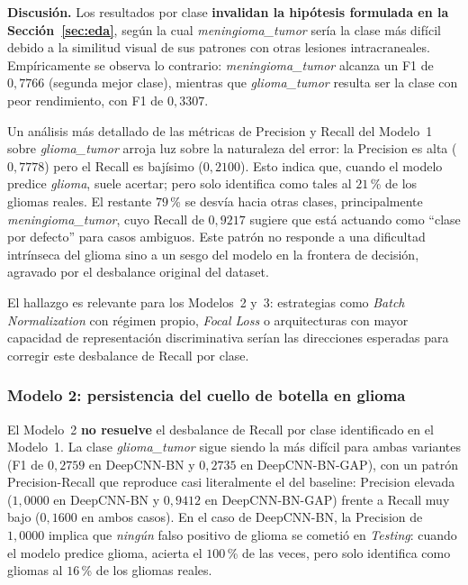 \noindent\textbf{Discusión.} Los resultados por clase
\textbf{invalidan la hipótesis formulada en la
Sección~\ref{sec:eda}}, según la cual
\textit{meningioma\_tumor} sería la clase más difícil debido a
la similitud visual de sus patrones con otras lesiones
intracraneales. Empíricamente se observa lo contrario:
\textit{meningioma\_tumor} alcanza un F1 de $0{,}7766$ (segunda
mejor clase), mientras que \textit{glioma\_tumor} resulta ser
la clase con peor rendimiento, con F1 de $0{,}3307$.

Un análisis más detallado de las métricas de Precision y Recall
del Modelo~1 sobre \textit{glioma\_tumor} arroja luz sobre la
naturaleza del error: la Precision es alta ($0{,}7778$) pero el
Recall es bajísimo ($0{,}2100$). Esto indica que, cuando el
modelo predice \textit{glioma}, suele acertar; pero solo
identifica como tales al $21$\,\% de los gliomas reales. El
restante $79$\,\% se desvía hacia otras clases, principalmente
\textit{meningioma\_tumor}, cuyo Recall de $0{,}9217$ sugiere
que está actuando como ``clase por defecto'' para casos
ambiguos. Este patrón no responde a una dificultad
intrínseca del glioma sino a un sesgo del modelo en la frontera
de decisión, agravado por el desbalance original del dataset.

El hallazgo es relevante para los Modelos~2 y~3: estrategias
como \textit{Batch Normalization} con régimen propio,
\textit{Focal Loss} o arquitecturas con mayor capacidad de
representación discriminativa serían las direcciones esperadas
para corregir este desbalance de Recall por clase.

\subsubsection*{Modelo 2: persistencia del cuello de botella en glioma}

El Modelo~2 \textbf{no resuelve} el desbalance de Recall por
clase identificado en el Modelo~1. La clase
\textit{glioma\_tumor} sigue siendo la más difícil para ambas
variantes (F1 de $0{,}2759$ en DeepCNN-BN y $0{,}2735$ en
DeepCNN-BN-GAP), con un patrón Precision-Recall que reproduce
casi literalmente el del baseline: Precision elevada
($1{,}0000$ en DeepCNN-BN y $0{,}9412$ en DeepCNN-BN-GAP) frente
a Recall muy bajo ($0{,}1600$ en ambos casos). En el caso de
DeepCNN-BN, la Precision de $1{,}0000$ implica que
\emph{ningún} falso positivo de glioma se cometió en
\textit{Testing}: cuando el modelo predice glioma, acierta el
$100$\,\% de las veces, pero solo identifica como gliomas al
$16$\,\% de los gliomas reales.

